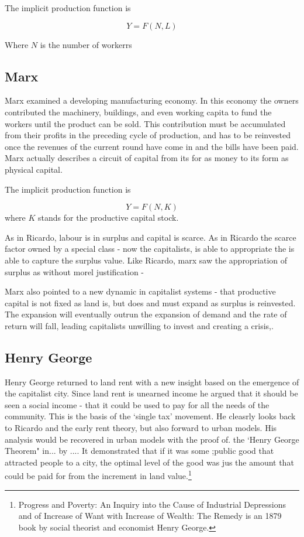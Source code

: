 The implicit production function is

\[Y=F(N, L)\]

Where $N$ is the number of workerrs

\subsection{Marx}
 Marx examined a developing manufacturing economy. In this economy the owners contributed the machinery, buildings, and even working capita to fund the workers until the product can be sold. This contribution must be accumulated from their profits in the preceding cycle of production,  and has to be reinvested once the revenues of the current round have come in and the bills have been paid. Marx actually describes a circuit of capital from its for as money to its form as physical capital. 
 
 
The implicit production function is

\[Y=F(N, K)\]
where $K$ stands for the productive capital stock. 

As in Ricardo, labour is in surplus and capital is scarce. As in Ricardo the scarce factor owned by a special class - now the capitalists, is able to appropriate the is able to capture the surplus value. Like Ricardo,  marx saw the appropriation of surplus as without morel justification - 


Marx also pointed to a new dynamic in capitalist systems - that productive capital is not fixed as land is, but does and must expand as surplus is reinvested. The expansion will eventually outrun the expansion of demand and the rate of return will fall, leading capitalists unwilling to invest and creating a crisis,.


 
\subsection{Henry George} 
  Henry George returned to land rent with a new insight based on the emergence of the capitalist city. Since land rent is unearned income he argued that it should be seen a social income - that it could be used to pay for all the needs of the community. This is the basis of the `single tax' movement. He cleasrly looks back to Ricardo and the early rent theory, but also forward to urban models. His analysis would be recovered in urban models with the proof of. the `Henry George Theorem" in... by .... It demonstrated that if it was some ;public good that attracted people to a city, the optimal level of the good was jus the amount that could be paid for from the increment in land value.\footnote{Progress and Poverty: An Inquiry into the Cause of Industrial Depressions and of Increase of Want with Increase of Wealth: The Remedy is an 1879 book by social theorist and economist Henry George.}
  
